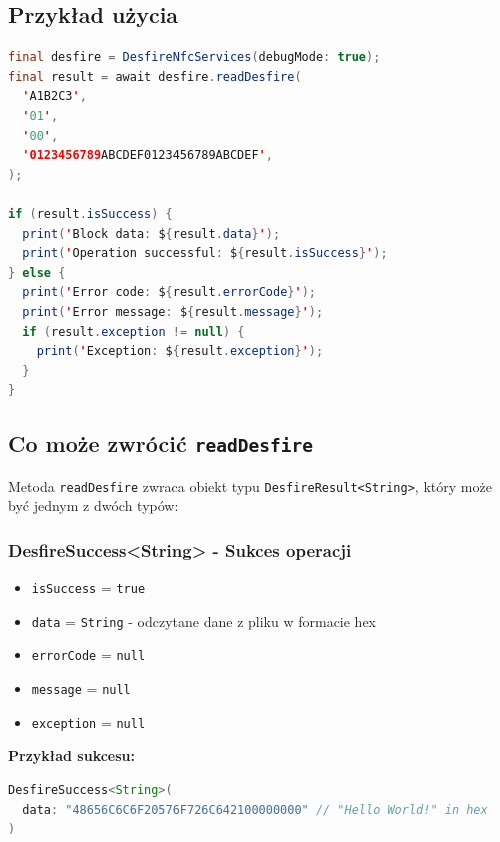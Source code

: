 \documentclass[a4paper,12pt]{article}
\begin{document}
\clearpage

\newpage

\subsection{Przykład użycia}
\begin{lstlisting}[language=Java]
final desfire = DesfireNfcServices(debugMode: true);
final result = await desfire.readDesfire(
  'A1B2C3',
  '01',
  '00',
  '0123456789ABCDEF0123456789ABCDEF',
);

if (result.isSuccess) {
  print('Block data: ${result.data}');
  print('Operation successful: ${result.isSuccess}');
} else {
  print('Error code: ${result.errorCode}');
  print('Error message: ${result.message}');
  if (result.exception != null) {
    print('Exception: ${result.exception}');
  }
}
\end{lstlisting}

\subsection{Co może zwrócić \texttt{readDesfire}}

Metoda \texttt{readDesfire} zwraca obiekt typu \texttt{DesfireResult<String>}, który może być jednym z dwóch typów:

\subsubsection*{DesfireSuccess<String> - Sukces operacji}
\begin{itemize}
    \item \texttt{isSuccess} = \texttt{true}
    \item \texttt{data} = \texttt{String} - odczytane dane z pliku w formacie hex
    \item \texttt{errorCode} = \texttt{null}
    \item \texttt{message} = \texttt{null}
    \item \texttt{exception} = \texttt{null}
\end{itemize}

\textbf{Przykład sukcesu:}
\begin{lstlisting}[language=Java]
DesfireSuccess<String>(
  data: "48656C6C6F20576F726C642100000000" // "Hello World!" in hex
)
\end{lstlisting}

\newpage
\end{document}
